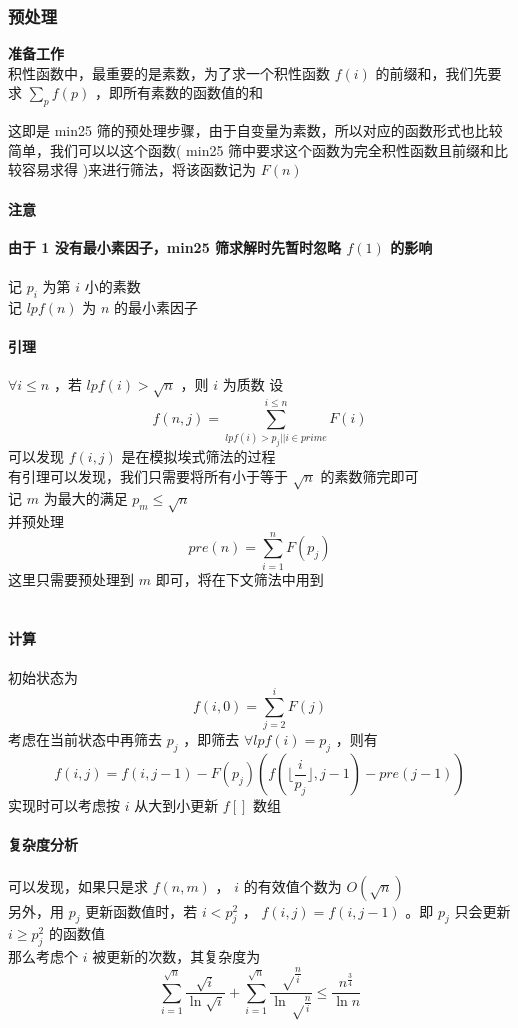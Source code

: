 	\subsubsection{预处理}
	\textbf{\large 准备工作}\\
	
	积性函数中，最重要的是素数，为了求一个积性函数 $f(i)$ 的前缀和，我们先要求 $\sum_p f(p)$ ，即所有素数的函数值的和
	
	这即是 min25 筛的预处理步骤，由于自变量为素数，所以对应的函数形式也比较简单，我们可以以这个函数( min25 筛中要求这个函数为完全积性函数且前缀和比较容易求得 )来进行筛法，将该函数记为 $F(n)$\\
	\paragraph{注意	}\textbf{由于 1 没有最小素因子，min25 筛求解时先暂时忽略 $f(1)$ 的影响}\\
	~\\
	记 $p_i$ 为第 $i$ 小的素数\\
	记 $lpf(n)$ 为 $n$ 的最小素因子\\
	\paragraph{引理}  $\forall i\le n$ ，若 $lpf(i)> \sqrt n$ ，则 $i$ 为质数
	设
	$$
	f(n,j)=\sum_{lpf(i)>p_j||i\in prime}^{i\le n} F(i)
	$$
	可以发现 $f(i,j)$ 是在模拟埃式筛法的过程\\
	有引理可以发现，我们只需要将所有小于等于 $\sqrt n$ 的素数筛完即可\\
	记 $m$ 为最大的满足 $p_m\le\sqrt n$ \\
	并预处理\\
	$$
	pre(n)=\sum_{i=1}^nF(p_j)
	$$
	这里只需要预处理到 $m$ 即可，将在下文筛法中用到\\
	~\\
	~\\
	\textbf{\large 计算}\\
	~\\
	初始状态为
	$$
	f(i,0)=\sum_{j=2}^iF(j)
	$$
	考虑在当前状态中再筛去 $p_j$ ，即筛去 $\forall lpf(i)=p_j$ ，则有
	$$
	f(i,j)=f(i,j-1)-F(p_j)(f(\lfloor\frac{i}{p_j}\rfloor,j-1)-pre(j-1))
	$$
	实现时可以考虑按 $i$ 从大到小更新 $f[]$ 数组\\
	~\\
	\textbf{\large 复杂度分析}\\
	~\\
	可以发现，如果只是求 $f(n,m)$ ， $i$ 的有效值个数为 $O(\sqrt n)$ \\
	另外，用 $p_j$ 更新函数值时，若 $i<p_j^2$ ， $f(i,j)=f(i,j-1)$ 。即 $p_j$ 只会更新 $i\ge p_j^2$ 的函数值\\
	那么考虑个 $i$ 被更新的次数，其复杂度为
	$$
	\sum_{i=1}^{\sqrt n}\frac{\sqrt i}{\ln \sqrt i}+ \sum_{i=1}^{\sqrt n} \frac{\sqrt \frac{n}{i}}{\ln \sqrt \frac{n}{i}}\le\frac{n^{\frac{3}{4}}}{\ln n}
	$$\\
	~\\
	~\\
	~\\
